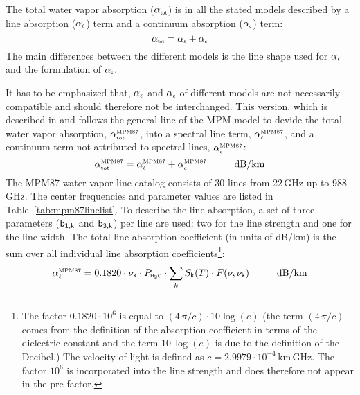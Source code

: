 The total water vapor absorption ($\alpha_{\mbox{\tiny \sf tot}}$) is in all the stated models 
described by a line absorption ($\alpha_{\mbox{\tiny $\ell$}}$) term and a continuum absorption 
($\alpha_{\mbox{\tiny \sf c}}$) term: 
\begin{equation}
  \label{eq:h2o:totabs}
  \alpha_{\mbox{\tiny \sf tot}} = \alpha_{\mbox{\tiny $\ell$}} + \alpha_{\mbox{\tiny \sf c}}
\end{equation}
The main differences between the different models is the line shape used for 
$\alpha_{\mbox{\tiny $\ell$}}$ and the formulation of $\alpha_{\mbox{\tiny \sf c}}$.

It has to be emphasized that, $\alpha_{\mbox{\tiny $\ell$}}$ and $\alpha_{\mbox{\tiny \sf c}}$ of different
models are not necessarily compatible and should therefore not be interchanged.
%
%
%
% 
\label{leveld:mpm87}
This version, which is described in \cite{liebeandlayton:87} and 
follows the general line of the MPM model to devide the total water vapor absorption, 
$\alpha^{\mbox{\rm \tiny MPM87}}_{\mbox{\tiny tot}}$, into a spectral line term, $\alpha^{\mbox{\rm \tiny MPM87}}_{\mbox{\tiny $\ell$}}$, and a 
continuum term not attributed to spectral lines, $\alpha^{\mbox{\rm \tiny MPM87}}_{\mbox{\tiny c}}$:
\begin{equation}
  \label{eq:mpm87_abs}
  \alphampmotot = \alphampmol + \alphampmoc\hspace*{10mm}\mbox{dB/km}
\end{equation}
%
%
\label{levele:h2o_mpm87_lines}
The MPM87 \cite{liebeandlayton:87} water vapor line catalog consists 
of 30 lines from 22\,GHz up to 988\,GHz. The center frequencies and parameter 
values are listed in Table~\ref{tab:mpm87linelist}. To describe the line 
absorption, a set of three parameters ($\sf b_{\sf 1,k}$ and $\sf b_{\sf 3,k}$) per line are used: two 
for the line strength and one for the line width. The total line 
absorption coefficient (in units of dB/km) is the sum over all 
individual line absorption coefficients\footnote{The factor 
  $0.1820 \cdot 10^{6}$ is equal to $(4\,\pi/c)\cdot 10\log{(e)}$
  (the term $(4\,\pi/c)$ comes from the definition of the absorption
  coefficient in terms of the dielectric constant and the term 
  $10\,\log{(e)}$ is due to the definition of the Decibel.) The
  velocity of light is defined as $c=2.9979\cdot 10^{-4}$\,km\,GHz. 
  The factor $10^{6}$ is incorporated into the line strength and 
  does therefore not appear in the pre-factor.}:
\begin{equation}
  \label{eq:mpm87:absline}
  \alphampmol = 0.1820 \cdot \nuk \cdot \phzo \cdot 
  \sum_{k}{\inten \cdot \shape}\hspace*{10mm}\mbox{dB/km}
\end{equation}
